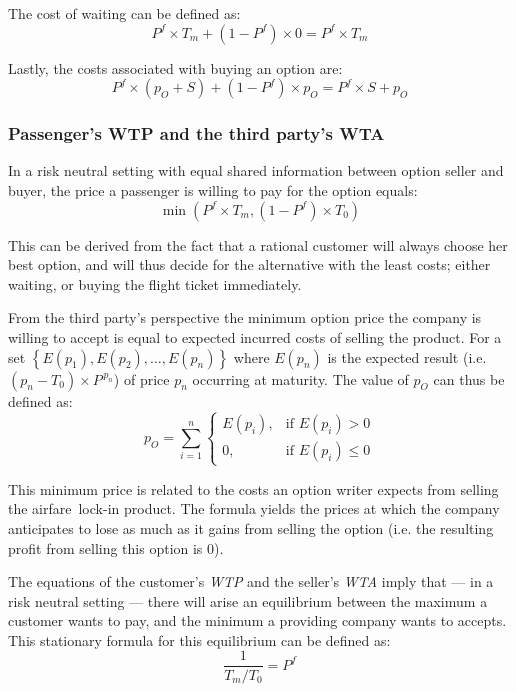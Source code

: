 The cost of waiting can be defined as:
\begin{equation*}
P^f \times T_m + (1 - P^f) \times 0 = P^f \times T_m
\end{equation*}

Lastly, the costs associated with buying an option are:
\begin{equation*}
P^f \times (p_O + S) + (1 - P^f) \times p_O = P^f \times S + p_O
\end{equation*}




\subsubsection{Passenger's WTP and the third party's WTA}
\label{subsec:PassengersWTP}
In a risk neutral setting with equal shared information between option seller and buyer, the price a passenger is willing to pay for the option equals:
\begin{equation}
\min(P^f \times T_m, (1 - P^f) \times T_0)
\end{equation}

This can be derived from the fact that a rational customer will always choose her best option, and will thus decide for the alternative with the least costs; either waiting, or buying the flight ticket immediately.

From the third party's perspective the minimum option price the company is willing to accept is equal to expected incurred costs of selling the product. For a set $\left\{ E(p_1), E(p_2), \ldots, E(p_n)\right\}$ where $E(p_n)$ is the expected result (i.e. $(p_n - T_0) \times P^{\,p_n}$) of price $p_n$ occurring at maturity. The value of $p_O$ can thus be defined as:
\begin{equation*}
p_O = \sum\limits_{i=1}^n\begin{cases}
     E(p_i), & \mbox{if } E(p_i) > 0 \\
    0, & \mbox{if } E(p_i) \le 0 \end{cases}
\end{equation*}

This minimum price is related to the costs an option writer expects from selling the airfare~lock-in product. The formula yields the prices at which the company anticipates to lose as much as it gains from selling the option (i.e. the resulting profit from selling this option is $0$).

The equations of the customer's \emph{WTP} and the seller's \emph{WTA} imply that --- in a risk neutral setting --- there will arise an equilibrium between the maximum a customer wants to pay, and the minimum a providing company wants to accepts. This stationary formula for this equilibrium can be defined as:
\begin{equation*}
\frac{1}{T_m/T_0} = P^f
\end{equation*}

